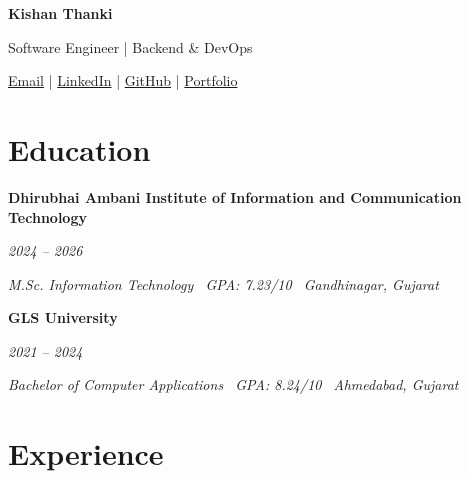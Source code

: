 \documentclass[10pt,a4paper]{article}
\newcommand{\datedentry}[2]{%
    \noindent
    \begin{minipage}[t]{0.72\linewidth}
        \raggedright
        \textbf{#1}
    \end{minipage}%
    \hfill
    \begin{minipage}[t]{0.25\linewidth}
        \raggedleft
        \textit{\color{textgray}#2}
    \end{minipage}%
    \par
}
\begin{document}
\begin{center}
    {\fontsize{24}{28}\selectfont
    \bfseries\color{accent} Kishan Thanki}
    \par\vspace{1.5pt}

    {\fontsize{10.5}{13}\selectfont
    \color{textgray}
    Software Engineer | Backend \& DevOps}
    \par\vspace{2.5pt}

    {\fontsize{10}{12}\selectfont
    \href{mailto:kishanthankiat10@gmail.com}{Email}
    \quad|\quad
    \href{https://www.linkedin.com/in/kishanthanki8}{LinkedIn}
    \quad|\quad
    \href{https://github.com/kishan-thanki}{GitHub}
    \quad|\quad
    \href{https://kishan-thanki.github.io/kishanthanki/}{Portfolio}
    }
\end{center}

\section*{Education}

\datedentry
    {Dhirubhai Ambani Institute of Information and Communication Technology}
    {2024 -- 2026}

\vspace{1.5pt}

{\fontsize{10}{12}\selectfont
\itshape\color{textgray}
M.Sc. Information Technology
\textperiodcentered\ GPA: 7.23/10
\textperiodcentered\ Gandhinagar, Gujarat
}

\vspace{4pt}

\datedentry
    {GLS University}
    {2021 -- 2024}

\vspace{1.5pt}

{\fontsize{10}{12}\selectfont
\itshape\color{textgray}
Bachelor of Computer Applications
\textperiodcentered\ GPA: 8.24/10
\textperiodcentered\ Ahmedabad, Gujarat
}

\section*{Experience}
\end{document}
